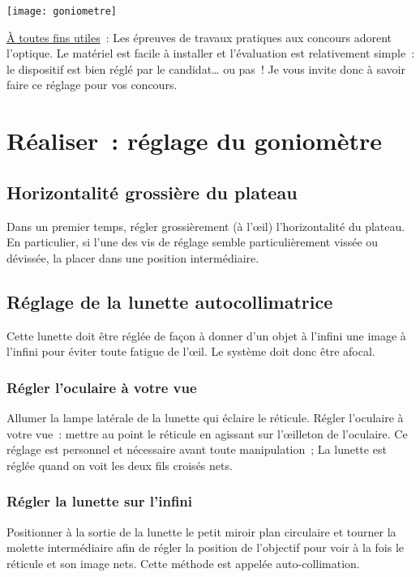 \documentclass[a4paper, 12pt, final, garamond]{book}
\begin{document}
\begin{center}
    \texttt{[image: goniometre]}
\end{center}
  
\underline{À toutes fins utiles}~: Les épreuves de travaux pratiques aux
concours adorent l'optique. Le matériel est facile à installer et l'évaluation
est relativement simple~: le dispositif est bien réglé par le candidat… ou pas~!
Je vous invite donc à savoir faire ce réglage pour vos concours.

\section{Réaliser~: réglage du goniomètre}

\subsection{Horizontalité grossière du plateau}

Dans un premier temps, régler grossièrement (à l'œil)  l'horizontalité du
plateau. En particulier, si l'une des vis de réglage semble particulièrement
vissée ou dévissée, la placer dans une position intermédiaire. 

\subsection{Réglage de la lunette autocollimatrice}

Cette lunette doit être réglée de façon à donner d'un objet à l'infini une image
à l'infini pour éviter toute fatigue de l'œil. Le système doit donc être afocal.

\subsubsection{Régler l'oculaire à votre vue}

Allumer la lampe latérale de la lunette qui éclaire le réticule.
Régler l'oculaire à votre vue~: mettre au point le réticule en agissant sur
l'œilleton de l'oculaire. Ce réglage est personnel et nécessaire avant toute
manipulation~; La lunette est réglée quand on voit les deux fils croisés nets.


\subsubsection{Régler la lunette sur l'infini}

Positionner à la sortie de la lunette le petit miroir plan circulaire et tourner
la molette intermédiaire afin de régler la position de l'objectif  pour voir à
la fois le réticule et son image nets. Cette méthode est appelée
auto-collimation. 
\end{document}
